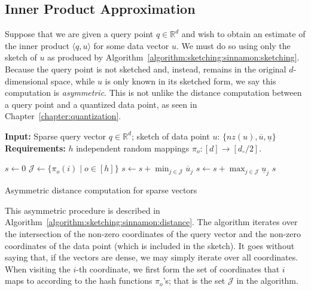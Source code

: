 \subsection{Inner Product Approximation}

Suppose that we are given a query point $q \in \mathbb{R}^d$ and wish to obtain an estimate
of the inner product $\langle q, u \rangle$ for some data vector $u$.
We must do so using only the sketch of $u$ as produced by
Algorithm~\ref{algorithm:sketching:sinnamon:sketching}.
Because the query point is not sketched and, instead, remains in the original
$d$-dimensional space, while $u$ is only known in its sketched form,
we say this computation is \emph{asymmetric}. This is not unlike the distance
computation between a query point and a quantized data point, as seen in
Chapter~\ref{chapter:quantization}.

\begin{algorithm}[t]
    \SetAlgoLined
    {\bf Input: }{Sparse query vector $q \in \mathbb{R}^d$;
    sketch of data point $u$: $\{ \mathit{nz}(u), \overline{u}, \underline{u} \}$}\\
    {\bf Requirements: }{$h$ independent random mappings $\pi_o: [d] \rightarrow [d_\circ/2]$.}\\
    
    \begin{algorithmic}[1]
        \STATE $s \leftarrow 0$
            \STATE $\mathcal{J} \leftarrow \{ \pi_o(i) \;|\; o \in [h] \}$
                \STATE $s \leftarrow s + \min_{j \in \mathcal{J}} \overline{u}_j$
            \ELSE
                \STATE $s \leftarrow s + \max_{j \in \mathcal{J}} \underline{u}_j$
            \ENDIF
        \ENDFOR
        \RETURN $s$
    \end{algorithmic}
    \caption{Asymmetric distance computation for sparse vectors}
    \label{algorithm:sketching:sinnamon:distance}
\end{algorithm}

This asymmetric procedure is described in Algorithm~\ref{algorithm:sketching:sinnamon:distance}.
The algorithm iterates over the intersection of the non-zero coordinates of the query vector
and the non-zero coordinates of the data point (which is included in the sketch).
It goes without saying that, if the vectors are dense, we may simply iterate over all coordinates.
When visiting the $i$-th coordinate, we first form the set of coordinates that $i$ maps to
according to the hash functions $\pi_o$'s; that is the set $\mathcal{J}$ in the algorithm.

